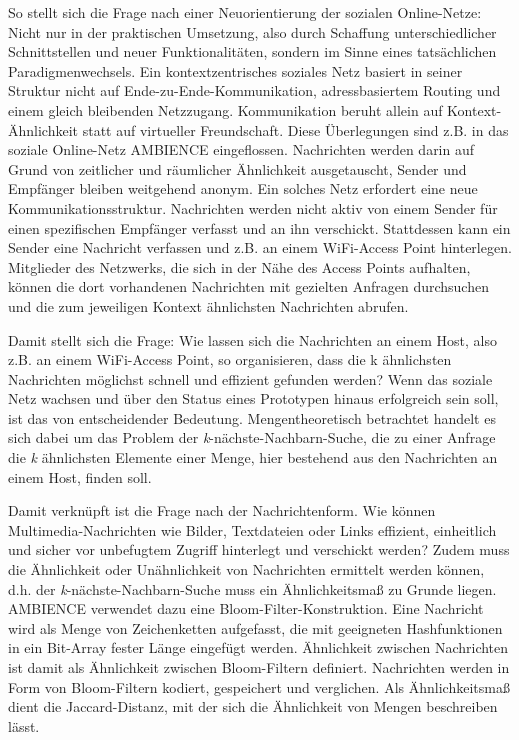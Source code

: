 So stellt sich die Frage nach einer Neuorientierung der sozialen Online-Netze: Nicht nur in der praktischen Umsetzung, also durch Schaffung unterschiedlicher Schnittstellen und neuer Funktionalitäten, sondern im  Sinne eines tatsächlichen Paradigmenwechsels. Ein kontextzentrisches soziales Netz basiert in seiner Struktur nicht auf Ende-zu-Ende-Kommunikation, adressbasiertem  Routing und einem gleich bleibenden Netzzugang. Kommunikation beruht allein auf Kontext-Ähnlichkeit statt auf virtueller Freundschaft. Diese Überlegungen sind z.B. in das soziale Online-Netz AMBIENCE eingeflossen. Nachrichten werden darin auf Grund von zeitlicher und räumlicher Ähnlichkeit ausgetauscht, Sender und Empfänger bleiben weitgehend anonym. Ein solches Netz erfordert eine neue Kommunikationsstruktur. Nachrichten werden nicht aktiv von einem Sender für einen spezifischen Empfänger verfasst und an ihn verschickt. Stattdessen kann ein Sender eine Nachricht verfassen und z.B. an einem WiFi-Access Point hinterlegen. Mitglieder des Netzwerks, die sich in der Nähe des Access Points aufhalten, können die dort vorhandenen Nachrichten mit gezielten Anfragen durchsuchen und die zum jeweiligen Kontext ähnlichsten Nachrichten abrufen. 

Damit stellt sich die Frage: Wie lassen sich die Nachrichten an einem Host, also z.B. an einem WiFi-Access Point, so organisieren, dass die k ähnlichsten Nachrichten möglichst schnell und effizient gefunden werden?  Wenn das soziale Netz wachsen und über den Status eines Prototypen hinaus erfolgreich sein soll, ist das von entscheidender Bedeutung. Mengentheoretisch betrachtet handelt es sich dabei um das Problem der \textit{k}-nächste-Nachbarn-Suche, die zu einer Anfrage die \textit{k} ähnlichsten Elemente einer Menge, hier bestehend aus den Nachrichten an einem Host, finden soll. 

Damit verknüpft ist die Frage nach der Nachrichtenform. Wie können Multimedia-Nach\-rich\-ten wie Bilder, Textdateien oder Links effizient, einheitlich und sicher vor unbefugtem Zugriff hinterlegt und verschickt werden? Zudem muss die Ähnlichkeit oder Unähnlichkeit von Nachrichten ermittelt werden können, d.h. der \textit{k}-nächste-Nachbarn-Suche muss ein Ähnlichkeitsmaß zu Grunde liegen. AMBIENCE verwendet dazu eine Bloom-Filter-Konstruktion. Eine Nachricht wird als Menge von Zeichenketten aufgefasst, die mit geeigneten Hashfunktionen in ein Bit-Array fester Länge eingefügt werden. Ähnlichkeit zwischen Nachrichten ist damit als Ähnlichkeit zwischen Bloom-Filtern definiert. Nachrichten werden in Form von Bloom-Filtern kodiert, gespeichert und verglichen. Als Ähnlichkeitsmaß dient die Jaccard-Distanz, mit der sich die Ähnlichkeit von Mengen beschreiben lässt. 


